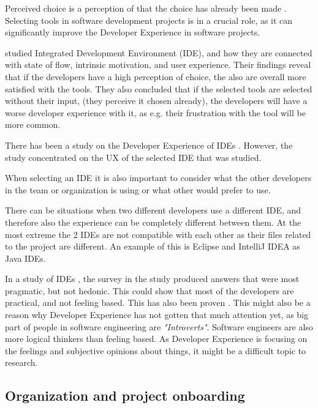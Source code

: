 \documentclass[english, 12pt, a4paper, sci, utf8, a-1b, online]{aaltothesis}
\begin{document}
Perceived choice is a perception of that the choice has already been made \parencite{flow-intrinsic-dx}. Selecting tools in software development projects is in a crucial role, as it can significantly improve the Developer Experience in software projects.

\textcite{flow-intrinsic-dx} studied Integrated Development Environment (IDE), and how they are connected with state of flow, intrinsic motivation, and user experience. Their findings reveal that if the developers have a high perception of choice, the also are overall more satisfied with the tools. They also concluded that if the selected tools are selected without their input, (they perceive it chosen already), the developers will have a worse developer experience with it, as e.g. their frustration with the tool will be more common.

There has been a study on the Developer Experience of IDEs \parencite{software-developers-as-users}. However, the study concentrated on the UX of the selected IDE that was studied.

When selecting an IDE it is also important to consider what the other developers in the team or organization is using or what other would prefer to use.

\textcite{design-framework-enchancing}

There can be situations when two different developers use a different IDE, and therefore also the experience can be completely different between them. At the most extreme the 2 IDEs are not compatible with each other as their files related to the project are different. An example of this is Eclipse and IntelliJ IDEA as Java IDEs.

In a study of IDEs \parencite{software-developers-as-users}, the survey in the study produced answers that were most pragmatic, but not hedonic. This could show that most of the developers are practical, and not feeling based. This has also been proven \parencite{personality-software}. This might also be a reason why Developer Experience has not gotten that much attention yet, as big part of people in software engineering are \textit{"Introverts"}. Software engineers are also more logical thinkers than feeling based. As Developer Experience is focusing on the feelings and subjective opinions about things, it might be a difficult topic to research.

\subsection{Organization and project onboarding}
\end{document}
